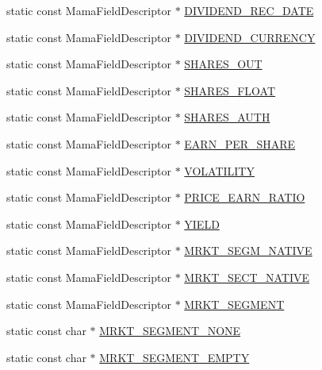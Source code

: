 \begin{CompactItemize}
\item 
static const Mama\-Field\-Descriptor $\ast$ \hyperlink{classWombat_1_1MamdaFundamentalFields_cdc497879c159945eb0e762c409d666e}{DIVIDEND\_\-REC\_\-DATE}
\item 
static const Mama\-Field\-Descriptor $\ast$ \hyperlink{classWombat_1_1MamdaFundamentalFields_e214bf94f28c6227ba2c75bdf0d020ec}{DIVIDEND\_\-CURRENCY}
\item 
static const Mama\-Field\-Descriptor $\ast$ \hyperlink{classWombat_1_1MamdaFundamentalFields_6633523c2cab42a937403a058aeab933}{SHARES\_\-OUT}
\item 
static const Mama\-Field\-Descriptor $\ast$ \hyperlink{classWombat_1_1MamdaFundamentalFields_5511bce98d85a5201376ea518eed6096}{SHARES\_\-FLOAT}
\item 
static const Mama\-Field\-Descriptor $\ast$ \hyperlink{classWombat_1_1MamdaFundamentalFields_69bd297e684e7b314ca6b1eda15eba4d}{SHARES\_\-AUTH}
\item 
static const Mama\-Field\-Descriptor $\ast$ \hyperlink{classWombat_1_1MamdaFundamentalFields_6ab5995bc6f2e79b8cc576edd80cecd5}{EARN\_\-PER\_\-SHARE}
\item 
static const Mama\-Field\-Descriptor $\ast$ \hyperlink{classWombat_1_1MamdaFundamentalFields_b171dc1932554796b0dd50346f54761f}{VOLATILITY}
\item 
static const Mama\-Field\-Descriptor $\ast$ \hyperlink{classWombat_1_1MamdaFundamentalFields_2d5fc4043c0dca952abffe3260c366bd}{PRICE\_\-EARN\_\-RATIO}
\item 
static const Mama\-Field\-Descriptor $\ast$ \hyperlink{classWombat_1_1MamdaFundamentalFields_7d162ed98b3839b425ac54231727d7c4}{YIELD}
\item 
static const Mama\-Field\-Descriptor $\ast$ \hyperlink{classWombat_1_1MamdaFundamentalFields_e9adfba169be32eba43965457e42bc83}{MRKT\_\-SEGM\_\-NATIVE}
\item 
static const Mama\-Field\-Descriptor $\ast$ \hyperlink{classWombat_1_1MamdaFundamentalFields_04258afc5e61f2c7b63956f173056d0a}{MRKT\_\-SECT\_\-NATIVE}
\item 
static const Mama\-Field\-Descriptor $\ast$ \hyperlink{classWombat_1_1MamdaFundamentalFields_4ad78b030704ffb11489a534363b33ca}{MRKT\_\-SEGMENT}
\item 
static const char $\ast$ \hyperlink{classWombat_1_1MamdaFundamentalFields_90bc743b579dfe8d866bc4601c9b3830}{MRKT\_\-SEGMENT\_\-NONE}
\item 
static const char $\ast$ \hyperlink{classWombat_1_1MamdaFundamentalFields_effa0e9358965deb3ab40070896ccf65}{MRKT\_\-SEGMENT\_\-EMPTY}

\end{CompactItemize}
